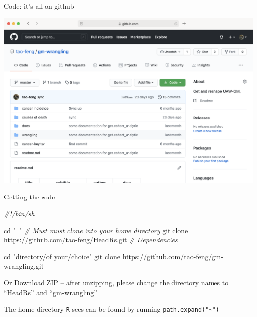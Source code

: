 \documentclass[
  ignorenonframetext,
  aspectratio=169,
]{beamer}
\newenvironment{Shaded}{\begin{snugshade}}{\end{snugshade}}
\newcommand{\BuiltInTok}[1]{#1}
\newcommand{\CommentTok}[1]{\textcolor[rgb]{0.56,0.35,0.01}{\textit{#1}}}
\newcommand{\FunctionTok}[1]{\textcolor[rgb]{0.00,0.00,0.00}{#1}}
\newcommand{\NormalTok}[1]{#1}
\newcommand{\StringTok}[1]{\textcolor[rgb]{0.31,0.60,0.02}{#1}}
\begin{document}
\begin{frame}{Code: it's all on github}
\protect\hypertarget{code-its-all-on-github}{}

\begin{center}
\begin{adjustbox}{max width = 0.75\linewidth}
\href{https://github.com/tao-feng/gm-wrangling.git}{\includegraphics{resources/repo.png}}
\end{adjustbox}
\end{center}

\end{frame}

\begin{frame}[fragile]{Getting the code}
\protect\hypertarget{getting-the-code}{}

\begin{Shaded}
\begin{Highlighting}[]
\CommentTok{#!/bin/sh }

\BuiltInTok{cd} \StringTok{"~"} \CommentTok{# Must must clone into your home directory}
\FunctionTok{git}\NormalTok{ clone https://github.com/tao-feng/HeadRs.git }\CommentTok{# Dependencies}

\BuiltInTok{cd} \StringTok{"directory/of your/choice"}
\FunctionTok{git}\NormalTok{ clone https://github.com/tao-feng/gm-wrangling.git}
\end{Highlighting}
\end{Shaded}

Or Download ZIP -- after unzipping, please change the directory names to
``HeadRs'' and ``gm-wrangling''

The home directory \texttt{R} sees can be found by running
\texttt{path.expand("\textasciitilde{}")}

\end{frame}
\end{document}
